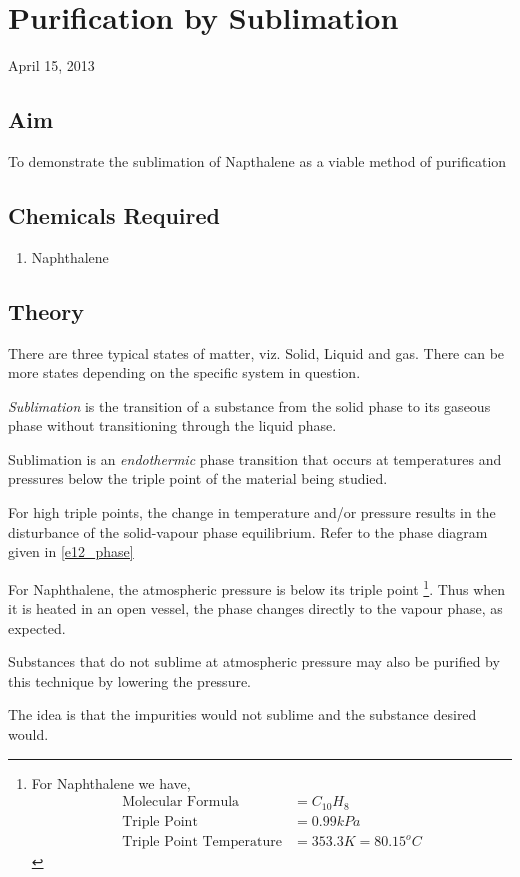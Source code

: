 \chapter{Purification by Sublimation}
\begin{flushright}
April 15, 2013
\end{flushright}
\section{Aim}
To demonstrate the sublimation of Napthalene as a viable method of purification

\section {Chemicals Required}
	\begin{enumerate}
		\item Naphthalene
	\end{enumerate}

\section{Theory}
	There are three typical states of matter, viz. Solid, Liquid and gas. There can be more states depending on the specific system in question.
	\par
	\emph{Sublimation} is the transition of a substance from the solid phase to its gaseous phase without transitioning through the liquid phase.
	\par
	Sublimation is an \emph{endothermic} phase transition that occurs at temperatures and pressures below the triple point of the material being studied.
	\par
	For high triple points, the change in temperature and/or pressure results in the disturbance of the solid-vapour phase equilibrium. Refer to the phase diagram given in \autoref{e12_phase}
	\par
	For Naphthalene, the atmospheric pressure is below its triple point \footnote{For Naphthalene we have,
	\begin{align*}
		\text{Molecular Formula} &= C_{10}H_8 \\
		\text{Triple Point} &= 0.99 kPa \\
		\text{Triple Point Temperature} &= 353.3 K = 80.15 ^o C
	\end{align*}	
	}. Thus when it is heated in an open vessel, the phase changes directly to the vapour phase, as expected.
	\par
	Substances that do not sublime at atmospheric pressure may also be purified by this technique by lowering the pressure.
	\par
	The idea is that the impurities would not sublime and the substance desired would.
	
